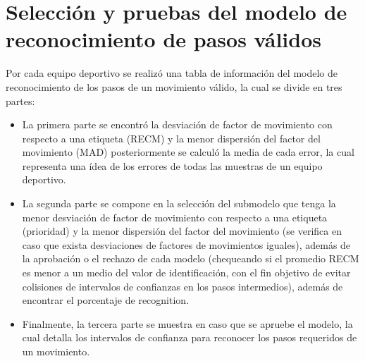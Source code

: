 \section{Selecci\'on y pruebas del modelo de reconocimiento de pasos v\'alidos} \label{res:chooseModel}
Por cada equipo deportivo se realiz\'o una tabla de informaci\'on del modelo de reconocimiento de los pasos de un movimiento v\'alido, la cual se divide en tres partes:
\begin{itemize}
\item  La primera parte se encontr\'o la desviaci\'on de factor de movimiento con respecto a una etiqueta  (RECM) y la menor dispersi\'on del factor del movimiento (MAD) posteriormente se calcul\'o la media de cada error, la cual representa una \'idea de los  errores de todas las muestras de un equipo deportivo.
\item  La segunda parte se compone en la selecci\'on del submodelo que tenga la menor desviaci\'on de factor de movimiento con respecto a una etiqueta  (prioridad) y la menor dispersi\'on del factor del movimiento  (se verifica en caso que exista desviaciones de factores de movimientos iguales), adem\'as de la aprobaci\'on o el rechazo de cada modelo (chequeando si el promedio RECM es menor a un medio del valor de identificaci\'on, con el fin objetivo de evitar colisiones de intervalos de confianzas en los pasos intermedios),  adem\'as de encontrar el porcentaje de recognition.
\item Finalmente, la tercera parte se muestra en caso que se apruebe el modelo, la cual detalla los intervalos de confianza para reconocer los pasos requeridos  de un movimiento.
\end{itemize}
